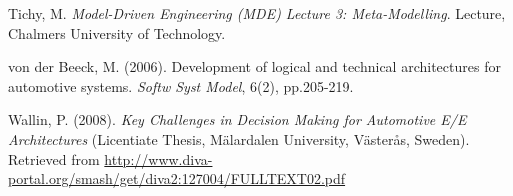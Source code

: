 \begin{thebibliography}{69}
Tichy, M. \textit{Model-Driven Engineering (MDE) Lecture 3: Meta-Modelling}. Lecture, Chalmers University of Technology.

von der Beeck, M. (2006). Development of logical and technical architectures for automotive systems. \textit{Softw Syst Model}, 6(2), pp.205-219.

Wallin, P. (2008). \textit{Key Challenges in Decision Making for Automotive E/E Architectures} (Licentiate Thesis, Mälardalen University, Västerås, Sweden). Retrieved from \url{http://www.diva-portal.org/smash/get/diva2:127004/FULLTEXT02.pdf} 

\end{thebibliography}
